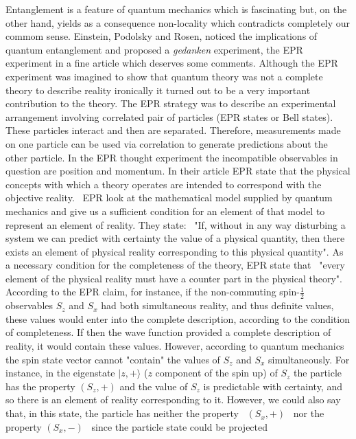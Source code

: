 \documentclass[12pt,thmsa]{article}
\begin{document}
Entanglement is a feature of quantum mechanics which is fascinating but, on
the other hand, yields as a consequence non-locality which contradicts
completely our commom sense. Einstein, Podolsky and Rosen, noticed the
implications of quantum entanglement and proposed a \textit{gedanken }%
experiment, the EPR experiment \cite{EPR, Omnes, Hughes, Krips, WallsMilburn}
in a fine article which deserves some comments. Although the EPR experiment
was imagined to show that quantum theory was not a complete theory to
describe reality ironically it turned out to be a very important
contribution to the theory. The EPR strategy was to describe an experimental
arrangement involving correlated pair of particles (EPR states or Bell
states). These particles interact and then are separated. Therefore,
measurements made on one particle can be used via correlation to generate
predictions about the other particle. In the EPR thought experiment the
incompatible observables in question are position and momentum. In their
article EPR state that the physical concepts with which a theory operates
are intended to correspond with the objective reality. \ EPR look at the
mathematical model supplied by quantum mechanics and give us a sufficient
condition for an element of that model to represent an element of reality.
They state: \ "If, without in any way disturbing a system we can predict
with certainty the value of a physical quantity, then there exists an
element of physical reality corresponding to this physical quantity". As a
necessary condition for the completeness of the theory, EPR state that \
"every element of the physical reality must have a counter part in the
physical theory". According to the EPR claim, for instance, if the
non-commuting spin-$\frac{1}{2}$ observables $S_{z}$ and $S_{x}$ had both
simultaneous reality, and thus definite values, these values would enter
into the complete description, according to the condition of completeness.
If then the wave function provided a complete description of reality, it
would contain these values. However, according to quantum mechanics the spin
state vector cannot "contain" the values of $S_{z}$ and $S_{x}$
simultaneously. For instance, in the eigenstate $|z,+\rangle $ ($z$
component of the spin up) of $S_{z}$ the particle has the property $%
(S_{z},+) $ and the value of $S_{z}$ is predictable with certainty, and so
there is an element of reality corresponding to it. However, we could also
say that, in this state, the particle has neither the property \ $(S_{x},+)$
\ nor the property $(S_{x},-)$ \ since the particle state could be projected
\end{document}
